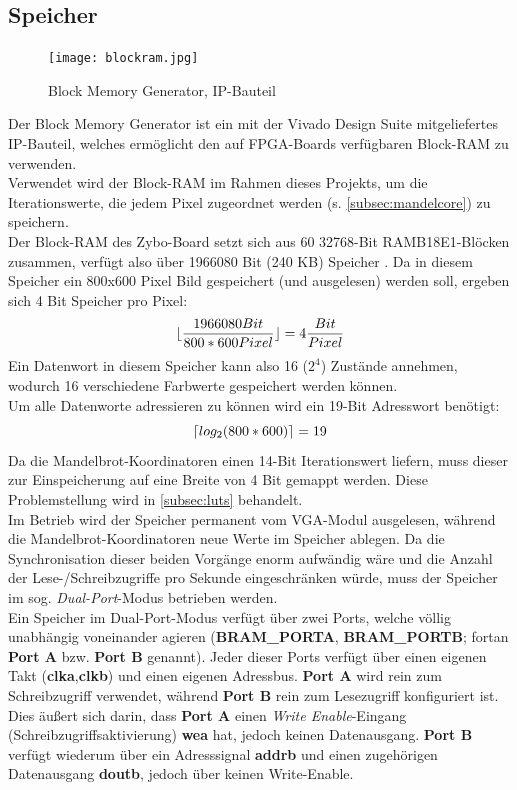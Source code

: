 \documentclass[a4paper,12pt,onesided]{report}
\begin{document}
\subsection{Speicher}
\label{subsec:ram}
\begin{figure}[H]
	\centering
	\texttt{[image: blockram.jpg]}
	\caption{Block Memory Generator, IP-Bauteil}
	\label{fig:schem_bram}
\end{figure}
Der Block Memory Generator ist ein mit der Vivado Design Suite mitgeliefertes IP-Bauteil, welches ermöglicht den auf FPGA-Boards verfügbaren Block-RAM zu verwenden.\\
Verwendet wird der Block-RAM im Rahmen dieses Projekts, um die Iterationswerte, die jedem Pixel zugeordnet werden (s. \autoref{subsec:mandelcore}) zu speichern.\\
Der Block-RAM des Zybo-Board setzt sich aus 60 32768-Bit RAMB18E1-Blöcken zusammen, verfügt also über 1966080 Bit (240 KB) Speicher \cite[S. 14]{bram} \cite{zyboref}.
Da in diesem Speicher ein 800x600 Pixel Bild gespeichert (und ausgelesen) werden soll, ergeben sich 4 Bit Speicher pro Pixel:
\[\lfloor\frac{1966080 Bit}{800*600 Pixel}\rfloor=4 \frac{Bit}{Pixel} \]
Ein Datenwort in diesem Speicher kann also 16 ($2^4$) Zustände annehmen, wodurch 16 verschiedene Farbwerte gespeichert werden können.\\
Um alle Datenworte adressieren zu können wird ein 19-Bit Adresswort benötigt:
\[\lceil log_2{(800*600)}\rceil=19\]
Da die Mandelbrot-Koordinatoren einen 14-Bit Iterationswert liefern, muss dieser zur Einspeicherung auf eine Breite von 4 Bit gemappt werden. Diese Problemstellung wird in \autoref{subsec:luts} behandelt.\\
Im Betrieb wird der Speicher permanent vom VGA-Modul ausgelesen, während die Mandelbrot-Koordinatoren neue Werte im Speicher ablegen. Da die Synchronisation dieser beiden Vorgänge enorm aufwändig wäre und die Anzahl der Lese-/Schreibzugriffe pro Sekunde eingeschränken würde, muss der Speicher im sog. \textit{Dual-Port}-Modus betrieben werden.\\
Ein Speicher im Dual-Port-Modus verfügt über zwei Ports, welche völlig unabhängig voneinander agieren (\textbf{BRAM\_PORTA}, \textbf{BRAM\_PORTB}; fortan \textbf{Port A} bzw. \textbf{Port B} genannt). 
Jeder dieser Ports verfügt über einen eigenen Takt (\textbf{clka},\textbf{clkb}) und einen eigenen Adressbus.
\textbf{Port A} wird rein zum Schreibzugriff verwendet, während \textbf{Port B} rein zum Lesezugriff konfiguriert ist. Dies äußert sich darin, dass \textbf{Port A} einen \textit{Write Enable}-Eingang (Schreibzugriffsaktivierung) \textbf{wea} hat, jedoch keinen Datenausgang. 
\textbf{Port B} verfügt wiederum über ein Adresssignal \textbf{addrb} und einen zugehörigen Datenausgang \textbf{doutb}, jedoch über keinen Write-Enable.
\end{document}
